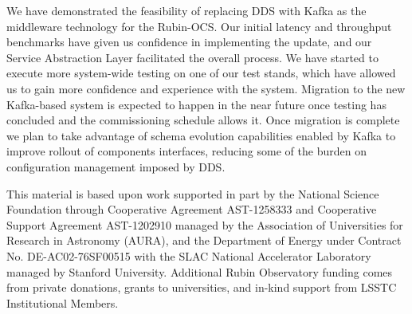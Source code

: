 \documentclass[]{spie}  %
\begin{document}
We have demonstrated the feasibility of replacing DDS with Kafka as the middleware technology for the Rubin-OCS.
Our initial latency and throughput benchmarks have given us confidence in implementing the update, and our Service Abstraction Layer facilitated the overall process.
We have started to execute more system-wide testing on one of our test stands, which have allowed us to gain more confidence and experience with the system.
Migration to the new Kafka-based system is expected to happen in the near future once testing has concluded and the commissioning schedule allows it.
Once migration is complete we plan to take advantage of schema evolution capabilities enabled by Kafka to improve rollout of components interfaces, reducing some of the burden on configuration management imposed by DDS.

\acknowledgments

This material is based upon work supported in part by the National Science Foundation through Cooperative Agreement AST-1258333 and Cooperative Support Agreement AST-1202910 managed by the Association of Universities for Research in Astronomy (AURA), and the Department of Energy under Contract No. DE-AC02-76SF00515 with the SLAC National Accelerator Laboratory managed by Stanford University.
Additional Rubin Observatory funding comes from private donations, grants to universities, and in-kind support from LSSTC Institutional Members.

\end{document}
